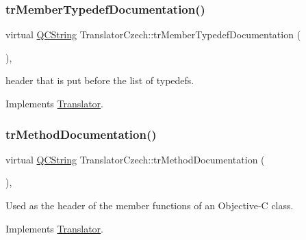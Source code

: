\mbox{\label{class_translator_czech_a813712a76b915e3dc85a6be76ab79b1a}} 
\subsubsection{\texorpdfstring{trMemberTypedefDocumentation()}{trMemberTypedefDocumentation()}}
{\footnotesize\ttfamily virtual \mbox{\hyperlink{class_q_c_string}{Q\+C\+String}} Translator\+Czech\+::tr\+Member\+Typedef\+Documentation (\begin{DoxyParamCaption}{ }\end{DoxyParamCaption})\hspace{0.3cm}{\ttfamily [inline]}, {\ttfamily [virtual]}}

header that is put before the list of typedefs. 

Implements \mbox{\hyperlink{class_translator}{Translator}}.

\mbox{\label{class_translator_czech_a7eed62b280db41321834f3561c1025d8}} 
\subsubsection{\texorpdfstring{trMethodDocumentation()}{trMethodDocumentation()}}
{\footnotesize\ttfamily virtual \mbox{\hyperlink{class_q_c_string}{Q\+C\+String}} Translator\+Czech\+::tr\+Method\+Documentation (\begin{DoxyParamCaption}{ }\end{DoxyParamCaption})\hspace{0.3cm}{\ttfamily [inline]}, {\ttfamily [virtual]}}

Used as the header of the member functions of an Objective-\/C class. 

Implements \mbox{\hyperlink{class_translator}{Translator}}.

\mbox{\label{class_translator_czech_ae26073360ea7857d1ccdbfd5888d4936}} 
